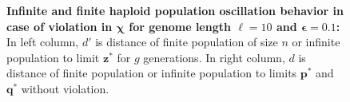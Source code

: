 \begin{figure}[h]
\begin{center}
\hspace{-3em}%
\vspace{-0.5em} \hspace{-3em}%

\caption[\textbf{Infinite and finite haploid population oscillation behavior in case of violation in $\bm{\chi}$ for genome length $\ell = 10$ and $\bm{\epsilon} = 0.1$}]{\textbf{Infinite and finite haploid population oscillation behavior in case of violation in $\bm{\chi}$ for genome length $\ell = 10$ and $\bm{\epsilon} = 0.1$:} 
  In left column, $d'$ is distance of finite population of size $n$ or infinite population to limit $\bm{z}^\ast$ for $g$ generations. In right column, $d$ is distance of finite population or infinite population to limits $\bm{p}^\ast$ and $\bm{q}^\ast$ without violation.}
\label{oscillation_10h_vio_chi_0.1}
\end{center}
\end{figure}


